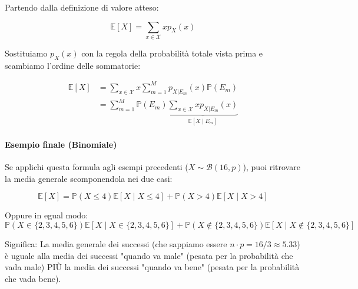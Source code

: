 Partendo dalla definizione di valore atteso:

\[
\mathbb{E}[X] = \sum_{x \in \mathcal{X}} x p_X(x)
\]

Sostituiamo $p_X(x)$ con la regola della probabilità totale vista prima e scambiamo l'ordine delle sommatorie:

\begin{equation}
\begin{aligned}
\mathbb{E}[X] &= \sum_{x \in \mathcal{X}} x \sum_{m=1}^M p_{X|E_m}(x)\mathbb{P}(E_m) \\
&= \sum_{m=1}^M \mathbb{P}(E_m) \underbrace{\sum_{x \in \mathcal{X}} x p_{X|E_m}(x)}_{\mathbb{E}[X \mid E_m]}
\end{aligned}
\end{equation}

\paragraph{Esempio finale (Binomiale)}
Se applichi questa formula agli esempi precedenti ($X \sim \mathcal{B}(16, p)$), puoi ritrovare la media generale scomponendola nei due casi:

\[
\mathbb{E}[X] = \mathbb{P}(X \le 4)\mathbb{E}[X \mid X \le 4] + \mathbb{P}(X > 4)\mathbb{E}[X \mid X > 4]
\]

Oppure in egual modo:
\[
\mathbb{P}(X \in \{2,3,4,5,6\}) \mathbb{E}[X \mid X \in \{2,3,4,5,6\}] + \mathbb{P}(X \notin \{2,3,4,5,6\}) \mathbb{E}[X \mid X \notin \{2,3,4,5,6\}]
\]

Significa: La media generale dei successi (che sappiamo essere $n \cdot p = 16/3 \approx 5.33$) è uguale alla media dei successi "quando va male" (pesata per la probabilità che vada male) PIÙ la media dei successi "quando va bene" (pesata per la probabilità che vada bene).

